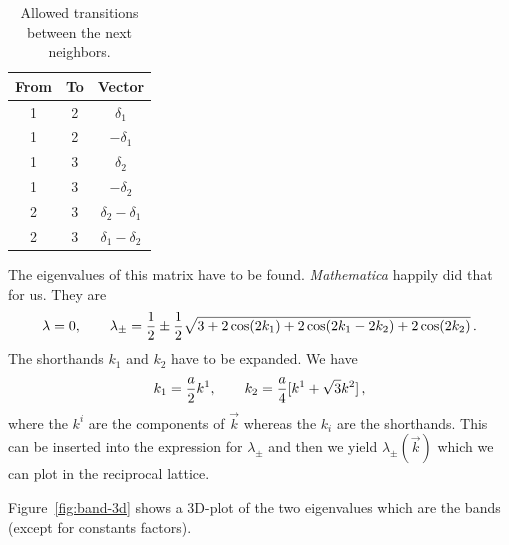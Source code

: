 \documentclass[11pt, english, fleqn, DIV=15, headinclude, BCOR=1cm]{scrartcl}
\begin{document}
\begin{table}
    \centering
    \begin{tabular}{ccc}
        \toprule
        From & To & Vector \\
        \midrule
        1 & 2 & $\delta_1$ \\
        1 & 2 & $-\delta_1$ \\
        1 & 3 & $\delta_2$ \\
        1 & 3 & $-\delta_2$ \\
        2 & 3 & $\delta_2 - \delta_1$ \\
        2 & 3 & $\delta_1 - \delta_2$ \\
        \bottomrule
    \end{tabular}
    \caption{%
        Allowed transitions between the next neighbors.
    }
    \label{tab:transitions}
\end{table}

The eigenvalues of this matrix have to be found. \emph{Mathematica} happily did
that for us. They are
\[
    \lambda = 0
    ,\qquad
    \lambda_\pm = \frac 12 \pm \frac 12 \sqrt{3 + 2 \cos(2 k_1) + 2 \cos(2 k_1
    - 2 k_2) + 2 \cos(2 k_2)} \,.
\]
The shorthands $k_1$ and $k_2$ have to be expanded. We have
\[
    k_1 = \frac a2 k^1
    ,\qquad
    k_2 = \frac a4 [k^1 + \sqrt 3 k^2] \,,
\]
where the $k^i$ are the components of $\vec k$ whereas the $k_i$ are the
shorthands. This can be inserted into the expression for $\lambda_\pm$ and then
we yield $\lambda_\pm(\vec k)$ which we can plot in the reciprocal lattice.



Figure~\ref{fig:band-3d} shows a 3D-plot of the two eigenvalues which are the
bands (except for constants factors).
\end{document}
